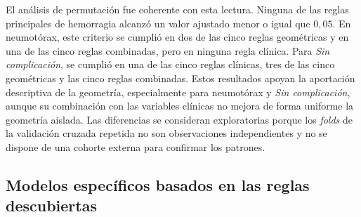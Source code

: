
El análisis de permutación fue coherente con esta lectura. Ninguna de las reglas principales de hemorragia alcanzó un valor ajustado menor o igual que \(0{,}05\). En neumotórax, este criterio se cumplió en dos de las cinco reglas geométricas y en una de las cinco reglas combinadas, pero en ninguna regla clínica. Para \textit{Sin complicación}, se cumplió en una de las cinco reglas clínicas, tres de las cinco geométricas y las cinco reglas combinadas. Estos resultados apoyan la aportación descriptiva de la geometría, especialmente para neumotórax y \textit{Sin complicación}, aunque su combinación con las variables clínicas no mejora de forma uniforme la geometría aislada. Las diferencias se consideran exploratorias porque los \textit{folds} de la validación cruzada repetida no son observaciones independientes y no se dispone de una cohorte externa para confirmar los patrones.


\subsection{Modelos específicos basados en las reglas descubiertas}


